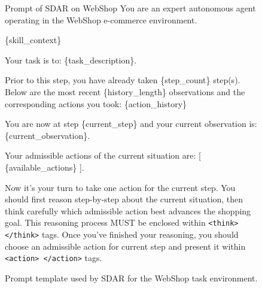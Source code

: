 \documentclass{llmxive}
\providecommand{\methodname}{\textsc{SDAR}\xspace}
\begin{document}
\begin{figure}[!htbp]
\centering
\begin{templatebox}{Prompt of \methodname on WebShop}
You are an expert autonomous agent operating in the WebShop e-commerce environment.

\{skill\_context\}

Your task is to: \{task\_description\}.

Prior to this step, you have already taken \{step\_count\} step(s). Below are the most recent \{history\_length\} observations and the corresponding actions you took: \{action\_history\}

You are now at step \{current\_step\} and your current observation is: \{current\_observation\}.

Your admissible actions of the current situation are:
[
\{available\_actions\}
].

Now it's your turn to take one action for the current step.
You should first reason step-by-step about the current situation, then think carefully which admissible action best advances the shopping goal. This reasoning process MUST be enclosed within \texttt{<think> </think>} tags.
Once you've finished your reasoning, you should choose an admissible action for current step and present it within \texttt{<action> </action>} tags.
\end{templatebox}
\caption{Prompt template used by \methodname{} for the WebShop task environment.}
\label{fig:prompt_webshop}
\end{figure}
\end{document}
